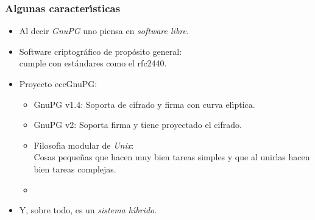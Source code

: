 \documentclass{beamer}
\def\ce{curva{} el\'{\i}ptica}%
\theoremstyle{plain}        			%
\theoremstyle{definition}   			%
\theoremstyle{saltolinea}   			%
\begin{document}
\begin{frame}
\frametitle{Algunas caracter\'{\i}sticas}
	\pause
	  \begin{itemize}[<+-| alert@+>]
		\item Al decir \emph{GnuPG} uno piensa en \emph{software libre}.
		\item Software criptogr\'afico de prop\'osito general: \\cumple con est\'andares como el rfc2440.
		\item Proyecto eccGnuPG: 
		\begin{itemize}[<+-| alert@+>]
			\item GnuPG v1.4: Soporta de cifrado y firma con {\ce}.
			\item GnuPG v2: Soporta firma y tiene proyectado el cifrado.
			\item[] Filosof\'{\i}a modular de \emph{Unix}:\\Cosas peque\~nas que hacen muy bien tareas simples y que al unirlas hacen bien tareas complejas.
			\item {\begin{center}\end{center}}
		\end{itemize}
		\item Y, sobre todo, es un \emph{sistema h\'{\i}brido}.
	  \end{itemize}
\end{frame}
\end{document}
